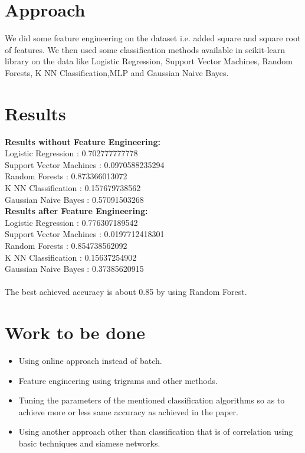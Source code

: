 \documentclass[a4paper,10pt]{article}
\begin{document}
\section{Approach}
We did some feature engineering on the dataset i.e. added square and square root of features. We then used some classification methods available in scikit-learn library on the data like Logistic Regression, Support Vector Machines, Random Forests, K NN Classification,MLP and Gaussian Naive Bayes.


\section{Results}

\textbf{Results without Feature Engineering:}\\
Logistic Regression : 0.702777777778\\
Support Vector Machines : 0.0970588235294\\
Random Forests : 0.873366013072\\
K NN Classification : 0.157679738562\\
Gaussian Naive Bayes : 0.57091503268\\
\newline
\textbf{Results after Feature Engineering:}\\
Logistic Regression : 0.776307189542\\
Support Vector Machines : 0.0197712418301\\
Random Forests : 0.854738562092\\
K NN Classification : 0.15637254902\\
Gaussian Naive Bayes : 0.37385620915\\
\\
The best achieved accuracy is about 0.85 by using Random Forest.

\section{Work to be done}
\begin{itemize}
\item Using online approach instead of batch.
\item Feature engineering using trigrams and other methods.
\item Tuning the parameters of the mentioned classification algorithms so as to achieve more or less same accuracy as achieved in the paper.
\item Using another approach other than classification that is of correlation using basic techniques and siamese networks.
\end{itemize}



\end{document}

